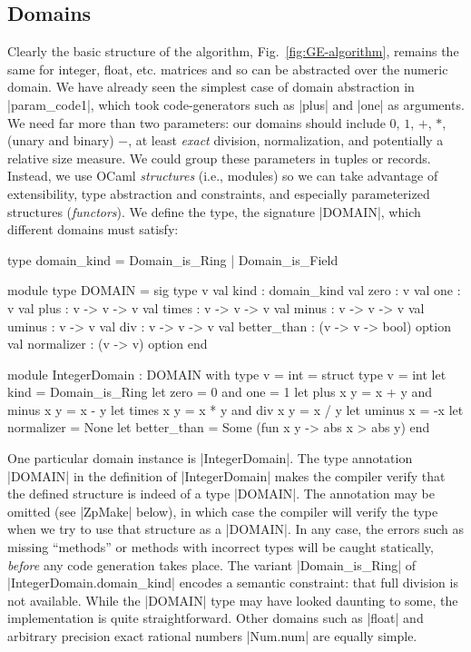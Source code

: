\documentclass{elsart}
\begin{document}
\subsection{Domains}\label{sec:domains}

Clearly the basic structure of the algorithm,
Fig.~\ref{fig:GE-algorithm}, remains the same for integer, float,
etc. matrices and so can be abstracted over the numeric domain.  We
have already seen the simplest case of domain abstraction in
|param_code1|, which took code-generators such as |plus| and |one| as
arguments.  We need far more than two parameters: our domains should
include $0$, $1$, $+$, $*$, (unary and binary) $-$, at least
\emph{exact} division, normalization, and potentially a relative size
measure. We could group these parameters in tuples or records.
Instead, we use OCaml \emph{structures} (i.e., modules) so we can take
advantage of extensibility, type abstraction and constraints, and
especially parameterized structures (\emph{functors}).  We define the
type, the signature |DOMAIN|, which different domains must satisfy:

\begin{code}
type domain_kind = Domain_is_Ring | Domain_is_Field

module type DOMAIN = sig
  type v
  val kind : domain_kind
  val zero : v
  val one  : v
  val plus : v -> v -> v
  val times  : v -> v -> v
  val minus  : v -> v -> v
  val uminus : v -> v
  val div    : v -> v -> v
  val better_than : (v -> v -> bool) option
  val normalizer  : (v -> v) option
end 

module IntegerDomain : DOMAIN with type v = int  = struct
  type v = int
  let kind = Domain_is_Ring
  let zero = 0 and one = 1
  let plus x y = x + y  and  minus x y = x - y
  let times x y = x * y and  div x y = x / y
  let uminus x = -x
  let normalizer = None
  let better_than = Some (fun x y -> abs x > abs y)
end
\end{code}

One particular domain instance is |IntegerDomain|. The type annotation
|DOMAIN| in the definition of |IntegerDomain| makes the 
compiler verify that the defined structure is indeed of a type |DOMAIN|. 
The annotation may be omitted (see |ZpMake| below), in which
case the compiler will verify the type when we try to use that structure as a
|DOMAIN|. In any case, the errors such as missing ``methods'' or
methods with incorrect types will be caught statically, 
\emph{before} any code generation takes place. The variant
|Domain_is_Ring| of |IntegerDomain.domain_kind| encodes a semantic constraint:
that full division
is not available. While the |DOMAIN| type may have looked daunting to
some, the implementation is quite straightforward.  Other domains such
as |float| and arbitrary precision exact rational numbers |Num.num|
are equally simple.
\end{document}
